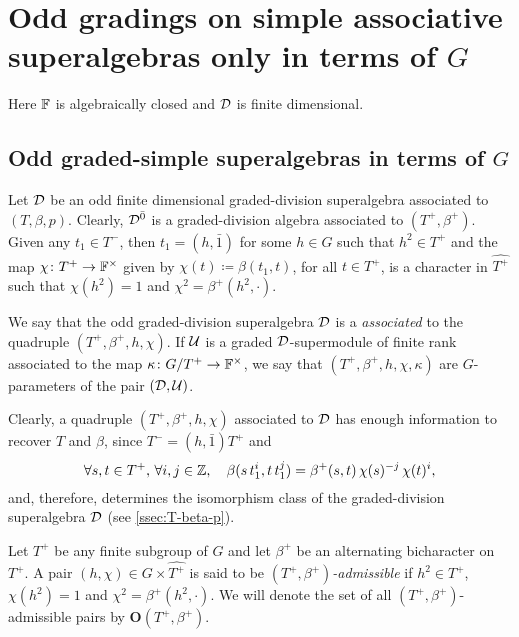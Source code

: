 \section{Odd gradings on simple associative superalgebras only in terms of \texorpdfstring{$G$}{G}}\label{sec:assc-only-G}

Here $\mathbb{F}$ is algebraically closed and $\mathcal{D}$ is finite dimensional.

\subsection{Odd graded-simple superalgebras in terms of \texorpdfstring{$G$}{G}}\label{ssec:odd-div-G-only}

Let $\mathcal{D}$ be an odd finite dimensional graded-division superalgebra associated to $(T, \beta, p)$. 
Clearly, $\mathcal{D}^{\bar0}$ is a graded-division algebra associated to $(T^+, \beta^+)$. 
Given any $t_1 \in T^-$, then $t_1 = (h, \bar 1)$ for some $h\in G$ such that $h^2\in T^+$ and the map $\chi \colon T^+ \to \mathbb{F}^\times$ given by $\chi(t) \coloneqq \beta(t_1, t)$, for all $t\in T^+$, is a character in $\widehat{T^+}$ such that $\chi(h^2) = 1$ and $\chi^2 = \beta^+ (h^2, \cdot)$. 

\begin{defi}\label{def:odd-parameters}
    We say that the odd graded-division superalgebra $\mathcal{D}$ is a \emph{associated} to the quadruple $(T^+, \beta^+, h,\chi)$. 
    If $\mathcal U$ is a graded $\mathcal{D}$-supermodule of finite rank associated to the map $\kappa\colon G/T^+ \to \mathbb{F}^\times$, we say that $(T^+, \beta^+, h, \chi, \kappa)$ are $G$-parameters of the pair $(\mathcal{D}, \mathcal U)$. 
\end{defi}

Clearly, a quadruple $(T^+, \beta^+, h,\chi)$ associated to $\mathcal{D}$ has enough information to recover $T$ and $\beta$, since $T^- = (h, \bar 1) T^+$ and
\[\label{eq:beta-from-h-chi}
    \forall s,t\in T^+,\, \forall i,j \in \mathbb{Z}, \quad \beta(s\, t_1^i,t \, t_1^j) = \beta^+(s,t)\, \chi (s)^{-j}\, \chi (t)^i,
\]
and, therefore, determines the isomorphism class of the graded-division superalgebra $\mathcal{D}$ (see \cref{ssec:T-beta-p}). 

\begin{defi}\label{def:O(T+-beta+)}
    Let $T^+$ be any finite subgroup of $G$ and let $\beta^+$ be an alternating bicharacter on $T^+$. 
    A pair $(h,\chi) \in G \times \widehat{T^+}$ is said to be \emph{$(T^+, \beta^+)$-admissible} if 
    $h^2 \in T^+$, $\chi(h^2) = 1$ and $\chi^2 = \beta^+(h^2, \cdot)$. 
    We will denote the set of all $(T^+, \beta^+)$-admissible pairs by $\mathbf {O} (T^+, \beta^+)$. 
\end{defi}

